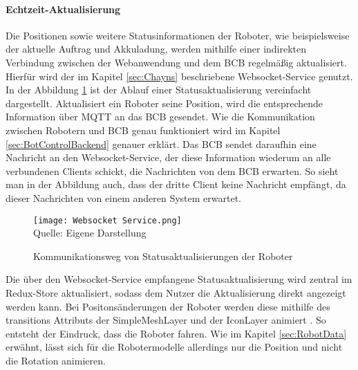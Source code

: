 \paragraph{Echtzeit-Aktualisierung}
Die Positionen sowie weitere Statusinformationen der Roboter, wie beispielsweise der aktuelle Auftrag und Akkuladung, werden mithilfe einer indirekten Verbindung zwischen der Webanwendung und dem \ac{BCB} regelmäßig aktualisiert. Hierfür wird der im Kapitel \ref{sec:Chayns} beschriebene \gls{Websocket}-Service genutzt. In der Abbildung \ref{fig:RobotStatusUpdate} ist der Ablauf einer Statusaktualisierung vereinfacht dargestellt. Aktualisiert ein Roboter seine Position, wird die entsprechende Information über \gls{MQTT} an das \ac{BCB} gesendet. Wie die Kommunikation zwischen Robotern und \ac{BCB} genau funktioniert wird im Kapitel \ref{sec:BotControlBackend} genauer erklärt.
Das \ac{BCB} sendet daraufhin eine Nachricht an den \gls{Websocket}-Service, der diese Information wiederum an alle verbundenen Clients schickt, die Nachrichten von dem \ac{BCB} erwarten. So sieht man in der Abbildung auch, dass der dritte Client keine Nachricht empfängt, da dieser Nachrichten von einem anderen System erwartet.

\begin{figure}[H]
    \centering
    \caption[]{Kommunikationsweg von Statusaktualisierungen der Roboter}\label{fig:RobotStatusUpdate}
    \texttt{[image: Websocket Service.png]}
    \\
    Quelle: Eigene Darstellung
\end{figure}

Die über den \gls{Websocket}-Service empfangene Statusaktualisierung wird zentral im Redux-Store aktualisiert, sodass dem Nutzer die Aktualisierung direkt angezeigt werden kann. Bei Positonsänderungen der Roboter werden diese mithilfe des transitions Attributs der SimpleMeshLayer und der IconLayer animiert \cite{DeckglLayerClass}. So entsteht der Eindruck, dass die Roboter fahren. Wie im Kapitel \ref{sec:RobotData} erwähnt, lässt sich für die Robotermodelle allerdings nur die Position und nicht die Rotation animieren.


